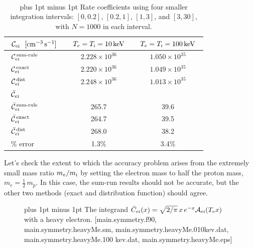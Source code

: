 \documentclass[preprint,12pt,eqsecnum,nofootinbib,amsmath,amssymb]{revtex4}
\newcommand{\smI}{{\rm\scriptscriptstyle I}}
\newcommand{\footnoteskip}{\baselineskip 12pt plus 1pt minus 1pt}
\begin{document}
~
\vskip-0.3cm 
\begin{table}[hb!]
\caption{\footnoteskip 
  Rate coefficients using four smaller integration intervals: $[0,
  0.2]$, $[0.2,1]$, $[1,3]$, and $[3,30]$, with $N=1000$ in each interval.
}
\begin{tabular}{|l||c|c|} \hline
   ~${\cal C}_{e\smI} ~~{\rm [cm^{-3} \,s^{-1}] }$~ & ~$T_e=T_\smI=10\,{\rm keV}$~     & ~$T_e=T_\smI=100\,{\rm keV}$~\\ \hline
   ~${\cal C}_{e\smI}^\text{\,sum-rule}$~             & ~$2.228 \times 10^{36}$~       & ~$1.050 \times 10^{35}$~     \\
   ~${\cal C}_{e\smI}^\text{\,exact}$~                & ~$2.220 \times 10^{36}$~       & ~$1.049 \times 10^{35}$~     \\
   ~${\cal C}_{e\smI}^\text{\,dist}$~                 & ~$2.248 \times 10^{36}$~       & ~$1.013 \times 10^{35}$~     \\\hline\hline
   ~$\bar{\cal C}_{e\smI} $~                        &      & \\\hline
   ~$\bar{\cal C}_{e\smI}^\text{\,sum-rule}$~         & ~265.7~         & ~39.6~     \\
   ~$\bar{\cal C}_{e\smI}^\text{\,exact}$~            & ~264.7~         & ~39.5~     \\
   ~$\bar{\cal C}_{e\smI}^\text{\,dist}$~             & ~268.0~         & ~38.2~     \\\hline
   ~\% error~                                         & ~1.3\%~         & ~3.4\%~     \\\hline
\end{tabular} 
\label{table:fractALP2}
\end{table}

\noindent
Let's check the extent to which the accuracy problem arises from the
extremely small mass ratio $m_e/m_\smI$ by setting the electron mass
to half the proton mass, $m_e = \frac{1}{2}\, m_p$. In this case, the
sum-run results should not be accurate, but the other two methods
(exact and distribution function) should agree.

\vskip-2.0cm 
\begin{figure}[h!]
\vskip-0.3cm 
\caption{\footnoteskip  
  The integrand $\bar C_{e\smI}(x)=\sqrt{2/\pi}\, x\, e^{-x} {\cal
  A}_{e\smI}(T_e x)$ with a heavy electron. [main.symmetry.f90, \\
  main.symmetry.heavyMe.sm, main.symmetry.heavyMe.010kev.dat, 
  main.symmetry.heavyMe.100 kev.dat, main.symmetry.heavyMe.eps]
}
\label{fig:main.symmetry.heavyMe.eps}
\end{figure}
\end{document}
